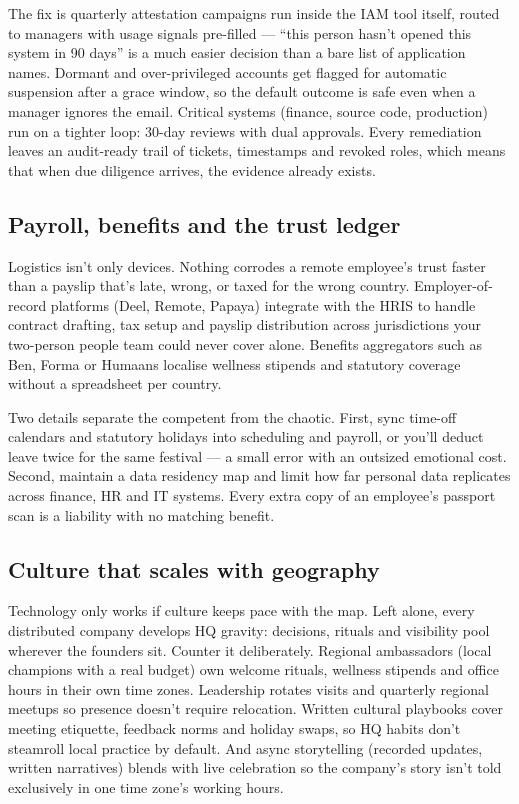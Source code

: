 The fix is quarterly attestation campaigns run inside the IAM tool itself, routed to managers with usage signals pre-filled — ``this person hasn't opened this system in 90 days'' is a much easier decision than a bare list of application names. Dormant and over-privileged accounts get flagged for automatic suspension after a grace window, so the default outcome is safe even when a manager ignores the email. Critical systems (finance, source code, production) run on a tighter loop: 30-day reviews with dual approvals. Every remediation leaves an audit-ready trail of tickets, timestamps and revoked roles, which means that when due diligence arrives, the evidence already exists.



\subsection{Payroll, benefits and the trust ledger}


Logistics isn't only devices. Nothing corrodes a remote employee's trust faster than a payslip that's late, wrong, or taxed for the wrong country. Employer-of-record platforms (Deel, Remote, Papaya) integrate with the HRIS to handle contract drafting, tax setup and payslip distribution across jurisdictions your two-person people team could never cover alone. Benefits aggregators such as Ben, Forma or Humaans localise wellness stipends and statutory coverage without a spreadsheet per country.


Two details separate the competent from the chaotic. First, sync time-off calendars and statutory holidays into scheduling and payroll, or you'll deduct leave twice for the same festival — a small error with an outsized emotional cost. Second, maintain a data residency map and limit how far personal data replicates across finance, HR and IT systems. Every extra copy of an employee's passport scan is a liability with no matching benefit.



\subsection{Culture that scales with geography}


Technology only works if culture keeps pace with the map. Left alone, every distributed company develops HQ gravity: decisions, rituals and visibility pool wherever the founders sit. Counter it deliberately. Regional ambassadors (local champions with a real budget) own welcome rituals, wellness stipends and office hours in their own time zones. Leadership rotates visits and quarterly regional meetups so presence doesn't require relocation. Written cultural playbooks cover meeting etiquette, feedback norms and holiday swaps, so HQ habits don't steamroll local practice by default. And async storytelling (recorded updates, written narratives) blends with live celebration so the company's story isn't told exclusively in one time zone's working hours.



